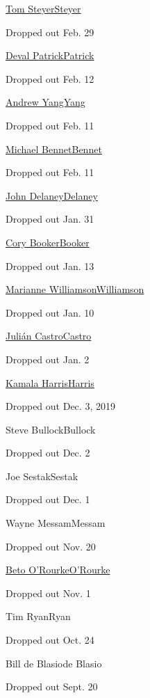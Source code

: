 \href{https://www.nytimes.com/interactive/2020/us/elections/tom-steyer.html}{Tom
SteyerSteyer}

Dropped out Feb. 29

\href{https://www.nytimes.com/interactive/2020/us/elections/deval-patrick.html}{Deval
PatrickPatrick}

Dropped out Feb. 12

\href{https://www.nytimes.com/interactive/2020/us/elections/andrew-yang.html}{Andrew
YangYang}

Dropped out Feb. 11

\href{https://www.nytimes.com/interactive/2020/us/elections/michael-bennet.html}{Michael
BennetBennet}

Dropped out Feb. 11

\href{https://www.nytimes.com/interactive/2020/us/elections/john-delaney.html}{John
DelaneyDelaney}

Dropped out Jan. 31

\href{https://www.nytimes.com/interactive/2020/us/elections/cory-booker.html}{Cory
BookerBooker}

Dropped out Jan. 13

\href{https://www.nytimes.com/interactive/2020/us/elections/marianne-williamson.html}{Marianne
WilliamsonWilliamson}

Dropped out Jan. 10

\href{https://www.nytimes.com/interactive/2020/us/elections/julian-castro.html}{Julián
CastroCastro}

Dropped out Jan. 2

\href{https://www.nytimes.com/interactive/2020/us/elections/kamala-harris.html}{Kamala
HarrisHarris}

Dropped out Dec. 3, 2019

Steve BullockBullock

Dropped out Dec. 2

Joe SestakSestak

Dropped out Dec. 1

Wayne MessamMessam

Dropped out Nov. 20

\href{https://www.nytimes.com/interactive/2020/us/elections/beto-orourke.html}{Beto
O'RourkeO'Rourke}

Dropped out Nov. 1

Tim RyanRyan

Dropped out Oct. 24

Bill de Blasiode Blasio

Dropped out Sept. 20

